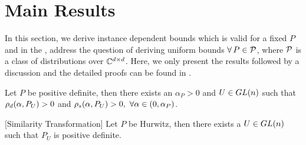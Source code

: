 \section{Main Results}\label{sec:mainresults}
In this section, we derive instance dependent bounds  which is valid for a fixed $P$ and in the , address the question of deriving uniform bounds $\forall\,P\in \P$, where $\P$ is a class of distributions over $\C^{\dcd}$. Here, we only present the results followed by a discussion and the detailed proofs can be found in .
\begin{lemma}\label{lm:pd}
Let $P$ be positive definite, then there exists an $\alpha_P>0$ and $U\in \gln$ such that $\rhod{P_U}>0$ and $\rhos{P_U}>0,~\forall \alpha \in (0,\alpha_P)$.
\end{lemma}
\begin{lemma}\label{lm:simtran}[Similarity Transformation]
Let $P$ be Hurwitz, then there exists a $U\in \gln$ such that $P_U$ is positive definite.
\end{lemma}
\begin{comment}
\begin{proof}
\begin{align*}
\rhos{P}&=\inf_{x:\norm{x}=1}x^* (A_P+A_P^*)x -\alpha x^*\EE{A_t^* A_t} x\\
&=\inf_{x:\norm{x}=1}x^* (A_P+A_P^*)x -\alpha x^* A^*_P A_P -\alpha x^* \EE{M_t^* M_t} x\\
&\geq \lambda_{\min}(A^*_P+A_P)-\alpha \norm{A_P}^2-\sigma^2_P
\end{align*}
The proof is complete by choosing $\alpha_P<\frac{\lambda_{\min}(A^*_P+A_P)}{\norm{A_P}^2+\sigma^2_P}$
\end{proof}
\end{comment}


